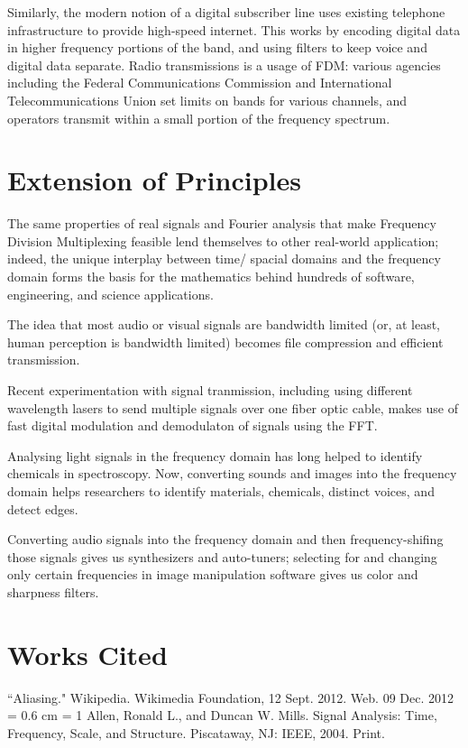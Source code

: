 \documentclass[12pt]{article}
\begin{document}
Similarly, the modern notion of a digital subscriber line uses existing
telephone infrastructure to provide high-speed internet. This works by encoding
digital data in higher frequency portions of the band, and using filters to
keep voice and digital data separate. Radio transmissions is
a usage of FDM: various agencies including the Federal Communications Commission
and International Telecommunications Union set limits on bands for various
channels, and operators transmit within a small portion of the frequency spectrum.

\clearpage
\section{Extension of Principles}

The same properties of real signals and Fourier analysis that make Frequency 
Division Multiplexing feasible lend themselves to other real-world application;
indeed, the unique interplay between time/ spacial domains and the frequency
domain forms the basis for the mathematics behind hundreds of software, engineering,
and science applications.

The idea that most audio or visual signals are bandwidth limited (or, at least,
human perception is bandwidth limited) becomes file compression and efficient
transmission. 

Recent experimentation with signal tranmission, including using 
different wavelength lasers to send multiple signals over one fiber optic cable,
makes use of fast digital modulation and demodulaton of signals using the FFT.

Analysing light signals in the frequency domain has long helped to identify 
chemicals in spectroscopy. Now, converting sounds and images into the frequency 
domain helps researchers to identify materials, chemicals, distinct voices, and 
detect edges.

Converting audio signals into the frequency domain and then frequency-shifing 
those signals gives us synthesizers and auto-tuners; selecting for and 
changing only certain frequencies in image manipulation software gives us 
color and sharpness filters.

\clearpage 

\section*{Works Cited}
``Aliasing." Wikipedia. Wikimedia Foundation, 12 Sept. 2012. Web. 09 Dec. 2012
\vspace{0.3 cm} \noindent \hangindent = 0.6 cm \hangafter = 1 {Allen, Ronald
L., and Duncan W. Mills. Signal Analysis: Time, Frequency, Scale, and
Structure. Piscataway, NJ: IEEE, 2004. Print.}
\end{document}
